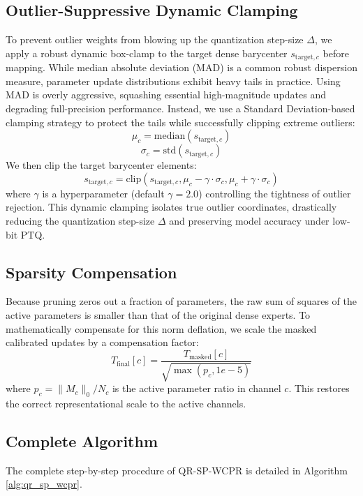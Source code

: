 \documentclass{article}
\theoremstyle{plain}
\theoremstyle{definition}
\theoremstyle{remark}
\begin{document}
\subsection{Outlier-Suppressive Dynamic Clamping}
To prevent outlier weights from blowing up the quantization step-size $\Delta$, we apply a robust dynamic box-clamp to the target dense barycenter $s_{\text{target},c}$ before mapping. While median absolute deviation (MAD) is a common robust dispersion measure, parameter update distributions exhibit heavy tails in practice. Using MAD is overly aggressive, squashing essential high-magnitude updates and degrading full-precision performance. Instead, we use a Standard Deviation-based clamping strategy to protect the tails while successfully clipping extreme outliers:
\begin{equation}
    \mu_c = \text{median}(s_{\text{target},c})
\end{equation}
\begin{equation}
    \sigma_c = \text{std}(s_{\text{target},c})
\end{equation}
We then clip the target barycenter elements:
\begin{equation}
    s_{\text{target},c} = \text{clip}(s_{\text{target},c}, \mu_c - \gamma \cdot \sigma_c, \mu_c + \gamma \cdot \sigma_c)
\end{equation}
where $\gamma$ is a hyperparameter (default $\gamma = 2.0$) controlling the tightness of outlier rejection. This dynamic clamping isolates true outlier coordinates, drastically reducing the quantization step-size $\Delta$ and preserving model accuracy under low-bit PTQ.

\subsection{Sparsity Compensation}
Because pruning zeros out a fraction of parameters, the raw sum of squares of the active parameters is smaller than that of the original dense experts. To mathematically compensate for this norm deflation, we scale the masked calibrated updates by a compensation factor:
\begin{equation}
    T_{\text{final}}[c] = \frac{T_{\text{masked}}[c]}{\sqrt{\max(p_c, 1e-5)}}
\end{equation}
where $p_c = \|M_c\|_0 / N_c$ is the active parameter ratio in channel $c$. This restores the correct representational scale to the active channels.

\subsection{Complete Algorithm}
The complete step-by-step procedure of QR-SP-WCPR is detailed in Algorithm \ref{alg:qr_sp_wcpr}.
\end{document}
